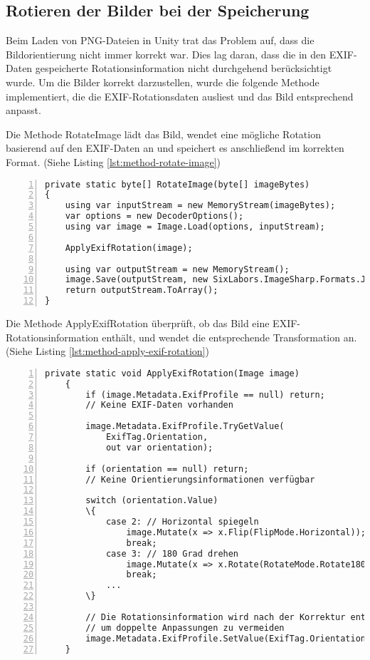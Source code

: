 \subsection{Rotieren der Bilder bei der Speicherung}

Beim Laden von PNG-Dateien in Unity trat das Problem auf, dass die Bildorientierung 
nicht immer korrekt war. Dies lag daran, dass die in den EXIF-Daten gespeicherte 
Rotationsinformation nicht durchgehend berücksichtigt wurde. Um die Bilder 
korrekt darzustellen, wurde die folgende Methode implementiert, die die 
EXIF-Rotationsdaten ausliest und das Bild entsprechend anpasst.

Die Methode RotateImage lädt das Bild, wendet eine mögliche Rotation 
basierend auf den EXIF-Daten an und speichert es anschließend im korrekten Format. 
(Siehe Listing \ref{lst:method-rotate-image})

\begin{lstlisting}[numbers=left,caption={Methode RotateImage},label={lst:method-rotate-image}]
private static byte[] RotateImage(byte[] imageBytes)
{
    using var inputStream = new MemoryStream(imageBytes);
    var options = new DecoderOptions();
    using var image = Image.Load(options, inputStream);
        
    ApplyExifRotation(image);
    
    using var outputStream = new MemoryStream();
    image.Save(outputStream, new SixLabors.ImageSharp.Formats.Jpeg.JpegEncoder());
    return outputStream.ToArray();
}    
\end{lstlisting}

Die Methode ApplyExifRotation überprüft, ob das Bild eine EXIF-Rotationsinformation enthält, 
und wendet die entsprechende Transformation an. 
(Siehe Listing \ref{lst:method-apply-exif-rotation})

\begin{lstlisting}[numbers=left,caption={Methode ApplyExifRotation},label={lst:method-apply-exif-rotation}]
    private static void ApplyExifRotation(Image image)
    {
        if (image.Metadata.ExifProfile == null) return; 
        // Keine EXIF-Daten vorhanden
                
        image.Metadata.ExifProfile.TryGetValue(
            ExifTag.Orientation, 
            out var orientation);
            
        if (orientation == null) return; 
        // Keine Orientierungsinformationen verfügbar
            
        switch (orientation.Value)
        \{
            case 2: // Horizontal spiegeln
                image.Mutate(x => x.Flip(FlipMode.Horizontal));
                break;
            case 3: // 180 Grad drehen
                image.Mutate(x => x.Rotate(RotateMode.Rotate180));
                break;
            ...
        \}
            
        // Die Rotationsinformation wird nach der Korrektur entfernt, 
        // um doppelte Anpassungen zu vermeiden
        image.Metadata.ExifProfile.SetValue(ExifTag.Orientation, (ushort)1);
    }    
\end{lstlisting}

